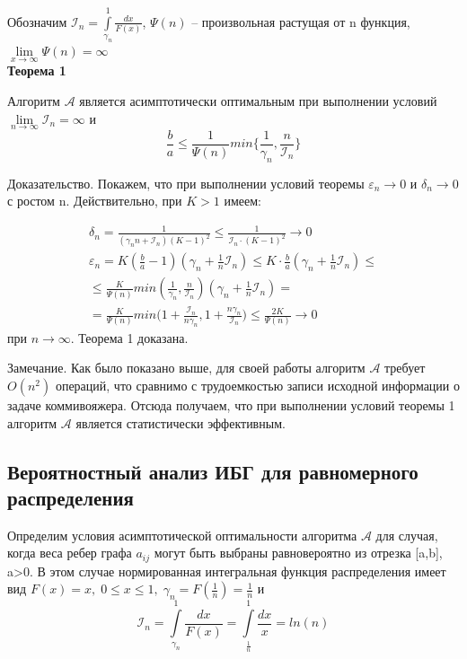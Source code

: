 \documentclass[a4paper, 14pt]{extarticle}
\numberwithin{equation}{section}
\begin{document}
Обозначим $\mathcal{I}_n = \int\limits_{\gamma_n}^1 \frac{dx}{F(x)}$, $\Psi(n)$ -- произвольная растущая от n функция, $\lim\limits_{x\to \infty} \Psi(n) = \infty $ \\

\textbf{Теорема 1}

Алгоритм $\mathcal{A}$ является асимптотически оптимальным при выполнении условий $\lim\limits_{{n} \to \infty} \mathcal{I}_n = \infty $ и 
\begin{equation}
\frac{b}{a} \leqslant \frac{1}{\Psi(n)} min \{ \frac{1}{\gamma_n}, \frac{n}{\mathcal{I}_n} \}
\end{equation}

Доказательство. Покажем, что при выполнении условий теоремы $\varepsilon_n \to 0$ и $\delta_n \to 0$ с ростом n. Действительно, при $K>1$ имеем:

\begin{equation}
\begin{aligned}
\delta_n = \frac{1}{(\gamma_n n+\mathcal{I}_n)(K-1)^2} \leqslant \frac{1}{\mathcal{I}_n \cdot (K-1)^2} \to 0 \\
\varepsilon_n = K(\frac{b}{a}-1)(\gamma_n+\frac{1}{n} \mathcal{I}_n) \leqslant K \cdot \frac{b}{a} (\gamma_n+\frac{1}{n} \mathcal{I}_n)\leqslant \\
\leqslant \frac{K}{\Psi(n)} min(\frac{1}{\gamma_n}, \frac{n}{\mathcal{I}_n})(\gamma_n+\frac{1}{n} \mathcal{I}_n) = \\
= \frac{K}{\Psi(n)} min \bigg(1+\frac{\mathcal{I}_n}{n \gamma_n}, 1+\frac{n \gamma_n}{\mathcal{I}_n} \bigg) \leqslant \frac{2K}{\Psi(n)} \to 0
\end{aligned}
\end{equation}
при $n \to \infty$. Теорема 1 доказана.

Замечание. Как было показано выше, для своей работы алгоритм $\mathcal{A}$ требует $O(n^2)$ операций, что сравнимо с трудоемкостью записи исходной информации о задаче коммивояжера. Отсюда получаем, что при выполнении условий теоремы 1 алгоритм $\mathcal{A}$ является статистически эффективным.\\


\subsection{Вероятностный анализ ИБГ для равномерного распределения}


Определим условия асимптотической оптимальности алгоритма $\mathcal{A}$ для случая, когда веса ребер графа $a_{ij}$ могут быть выбраны равновероятно из отрезка [a,b], a>0. В этом случае нормированная интегральная функция распределения имеет вид $F(x) = x,\; 0 \leqslant x \leqslant 1,\; \gamma_n = F(\frac{1}{n}) = \frac{1}{n}$ и
\begin{equation}
\mathcal{I}_n = \int\limits_{\gamma_n}^1 \frac{dx}{F(x)} = \int\limits_{\frac{1}{n}}^1 \frac{dx}{x} = ln(n)
\end{equation}
\end{document}
